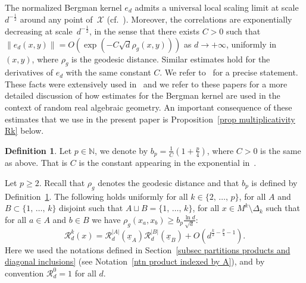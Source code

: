 \documentclass[10pt]{amsart}
\theoremstyle{definition}\newtheorem{defi}[theo]{Definition}\newtheorem{rema}[theo]{Remark}\newtheorem{exam}[theo]{Example}\newtheorem{exem}[theo]{Example}\newtheorem{nota}[theo]{Notation}
\newcommand{\X}{\mathcal{X}}
\newcommand{\clR}{\mathcal{R}}
\newcommand{\N}{\mathbb{N}}
\newcommand{\norm}[1]{\left\lvert #1 \right\rvert}
\renewcommand{\geq}{\geqslant}
\begin{document}
The normalized Bergman kernel $e_d$ admits a universal local scaling limit at scale~$d^{-\frac{1}{2}}$ around any point of~$\X$ (cf.~\cite[Theorem~4.2.1]{MM2007}). Moreover, the correlations are exponentially decreasing at scale~$d^{-\frac{1}{2}}$, in the sense that there exists $C>0$ such that $\|e_d(x,y)\| = O (\exp(-C\sqrt{d}\rho_g(x,y)))$ as $d \to +\infty$, uniformly in $(x,y)$, where $\rho_g$ is the geodesic distance. Similar estimates hold for the derivatives of $e_d$ with the same constant $C$. We refer to~\cite[Theorem~1]{MM2015} for a precise statement. These facts were extensively used in~\cite{Anc2019,Let2019,LP2019} and we refer to these papers for a more detailed discussion of how estimates for the Bergman kernel are used in the context of random real algebraic geometry. An important consequence of these estimates that we use in the present paper is Proposition~\ref{prop multiplicativity Rk} below.

\begin{defi}\label{def bp}
Let $p \in \N$, we denote by $b_p = \tfrac{1}{C}(1+\tfrac{p}{4})$, where $C>0$ is the same as above. That is $C$ is the constant appearing in the exponential in~\cite[Theorem~1, Equation~(1.3)]{MM2015}.
\end{defi}

\begin{prop}\label{prop multiplicativity Rk}
Let $p \geq 2$. Recall that $\rho_g$ denotes the geodesic distance and that $b_p$ is defined by Definition~\ref{def bp}. The following holds uniformly for all $k \in \{2,\,\dots,\,p\}$, for all $A$ and $B \subset \{1,\,\dots,\,k\}$ disjoint such that $A \sqcup B = \{1,\,\dots,\,k\}$, for all $x \in M^k \setminus \Delta_k$ such that for all $a \in A$ and $b \in B$ we have $\rho_g(x_a,x_b) \geq b_p \tfrac{\ln d}{\sqrt{d}}$:
\[
\clR^k_d(x) = \clR^{\norm{A}}_d(\underline{x}_A)\clR^{\norm{B}}_d(\underline{x}_B) + O\left(d^{\frac{k}{2}-\frac{p}{4}-1}\right).
\]
Here we used the notations defined in Section~\ref{subsec partitions products and diagonal inclusions} (see Notation~\ref{ntn product indexed by A}), and by convention $\clR_d^0=1$ for all $d$.
\end{prop}
\end{document}
